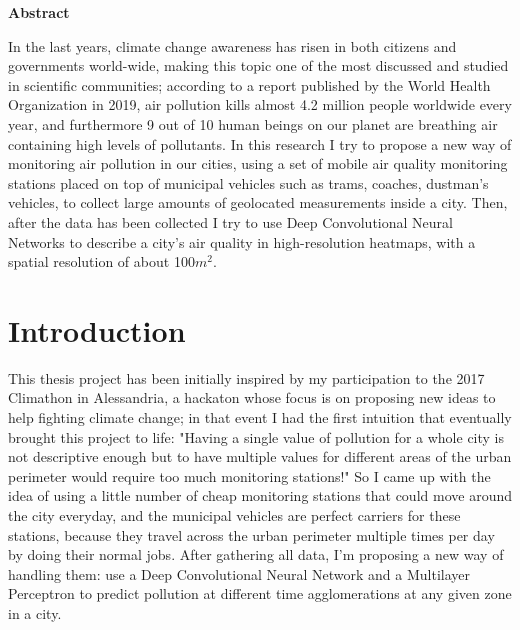 \documentclass[11pt,a4paper,titlepage]{book}
\begin{document}


\thispagestyle{plain}
\begin{center}
    \textbf{Abstract}
\end{center}
In the last years, climate change awareness has risen in both citizens and governments world-wide, making this topic one of the most discussed and studied in scientific communities; according to a report published by the World Health Organization in 2019, air pollution kills almost 4.2 million people worldwide every year, and furthermore 9 out of 10 human beings on our planet are breathing air containing high levels of pollutants.
\newline
In this research I try to propose a new way of monitoring air pollution in our cities, using a set of mobile air quality monitoring stations placed on top of municipal vehicles such as trams, coaches, dustman's vehicles,  to collect large amounts of geolocated measurements inside a city. Then, after the data has been collected I try to use Deep Convolutional Neural Networks to describe a city's air quality in high-resolution heatmaps, with a spatial resolution of about 100$m^2$.

\tableofcontents

\newpage
\thispagestyle{plain}

\chapter{Introduction}
This thesis project has been initially inspired by my participation to the 2017 Climathon in Alessandria, a hackaton whose focus is on proposing new ideas to help fighting climate change; in that event I had the first intuition that eventually brought this project to life: "Having a single value of pollution for a whole city is not descriptive enough but to have multiple values for different areas of the urban perimeter would require too much monitoring stations!"
\newline
So I came up with the idea of using a little number of cheap monitoring stations that could move around the city everyday, and the municipal vehicles are perfect carriers for these stations, because they travel across the urban perimeter multiple times per day by doing their normal jobs. After gathering all data, I'm proposing a new way of handling them: use a Deep Convolutional Neural Network and a Multilayer Perceptron to predict pollution at different time agglomerations at any given zone in a city.
\end{document}
